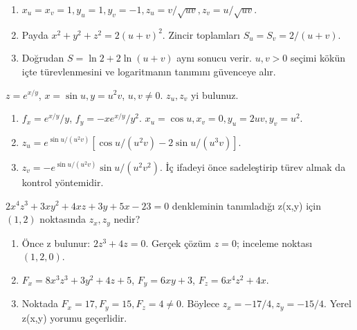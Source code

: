 \begin{tcolorbox}[title={Adım adım çözüm},colback=green!3!white,colframe=green]\begin{enumerate}
\item \(x_u=x_v=1,y_u=1,y_v=-1,z_u=v/\sqrt{uv},z_v=u/\sqrt{uv}\).
\item Payda \(x^2+y^2+z^2=2(u+v)^2\). Zincir toplamları \(S_u=S_v=2/(u+v)\).
\item Doğrudan \(S=\ln2+2\ln(u+v)\) aynı sonucu verir. \(u,v>0\) seçimi kökün içte türevlenmesini ve logaritmanın tanımını güvenceye alır.
\end{enumerate}\end{tcolorbox}
\begin{tcolorbox}[title={Örnek 6.5 | İki bağımsız yeni değişkenle karmaşık örnek},colframe=accent]\(z=e^{x/y}\), \(x=\sin u,y=u^2v\), \(u,v\ne0\). \(z_u,z_v\) yi bulunuz.
\par{}\end{tcolorbox}
\begin{tcolorbox}[title={Adım adım çözüm},colback=green!3!white,colframe=green]\begin{enumerate}
\item \(f_x=e^{x/y}/y\), \(f_y=-xe^{x/y}/y^2\). \(x_u=\cos u,x_v=0,y_u=2uv,y_v=u^2\).
\item \(z_u=e^{\sin u/(u^2v)}[\cos u/(u^2v)-2\sin u/(u^3v)]\).
\item \(z_v=-e^{\sin u/(u^2v)}\sin u/(u^2v^2)\). İç ifadeyi önce sadeleştirip türev almak da kontrol yöntemidir.
\end{enumerate}\end{tcolorbox}
\begin{tcolorbox}[title={Örnek 6.6 | Tahtadaki kapalı türev sorusu},colframe=accent]\(2x^4z^3+3xy^2+4xz+3y+5x-23=0\) denkleminin tanımladığı z(x,y) için \((1,2)\) noktasında \(z_x,z_y\) nedir?
\par{}\end{tcolorbox}
\begin{tcolorbox}[title={Adım adım çözüm},colback=green!3!white,colframe=green]\begin{enumerate}
\item Önce z bulunur: \(2z^3+4z=0\). Gerçek çözüm \(z=0\); inceleme noktası \((1,2,0)\).
\item \(F_x=8x^3z^3+3y^2+4z+5\), \(F_y=6xy+3\), \(F_z=6x^4z^2+4x\).
\item Noktada \(F_x=17,F_y=15,F_z=4\ne0\). Böylece \(z_x=-17/4,z_y=-15/4\). Yerel z(x,y) yorumu geçerlidir.
\end{enumerate}\end{tcolorbox}
